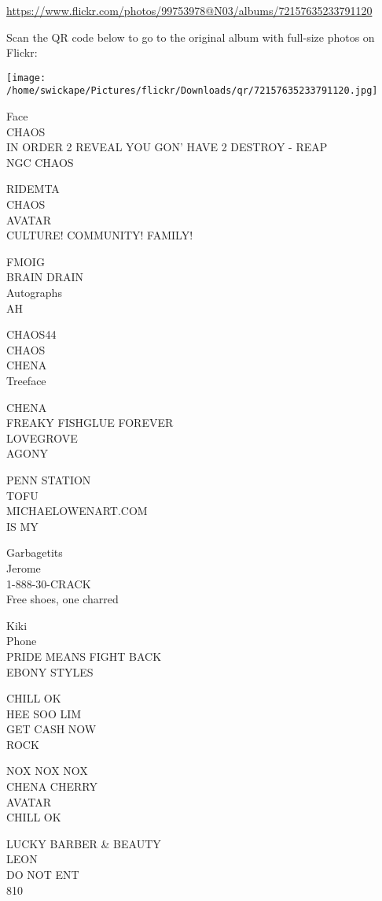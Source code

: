 \documentclass[10pt,letterpaper]{article}
\begin{document}
\url{https://www.flickr.com/photos/99753978@N03/albums/72157635233791120}

Scan the QR code below to go to the original album with full-size photos on Flickr:

\texttt{[image: /home/swickape/Pictures/flickr/Downloads/qr/72157635233791120.jpg]}


Face\\
CHAOS\\
IN ORDER 2 REVEAL YOU GON' HAVE 2 DESTROY {-} REAP\\
NGC CHAOS

RIDEMTA\\
CHAOS\\
AVATAR\\
CULTURE! COMMUNITY! FAMILY!

FMOIG\\
BRAIN DRAIN\\
Autographs\\
AH

CHAOS44\\
CHAOS\\
CHENA\\
Treeface

CHENA\\
FREAKY FISHGLUE FOREVER\\
LOVEGROVE\\
AGONY

PENN STATION\\
TOFU\\
MICHAELOWENART.COM\\
IS MY

Garbagetits\\
Jerome\\
1{-}888{-}30{-}CRACK\\
Free shoes, one charred

Kiki\\
Phone\\
PRIDE MEANS FIGHT BACK\\
EBONY STYLES

CHILL OK\\
HEE SOO LIM\\
GET CASH NOW\\
ROCK

NOX NOX NOX\\
CHENA CHERRY\\
AVATAR\\
CHILL OK

LUCKY BARBER \& BEAUTY\\
LEON\\
DO NOT ENT\\
810
\end{document}
